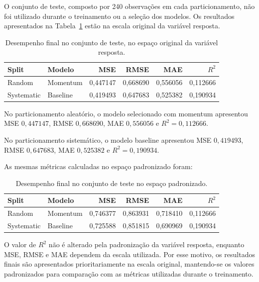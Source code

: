\documentclass[11pt,a4paper]{article}
\begin{document}
O conjunto de teste, composto por 240 observações em cada
particionamento, não foi utilizado durante o treinamento ou a seleção
dos modelos. Os resultados apresentados na
Tabela~\ref{tab:final_test} estão na escala original da variável
resposta.

\begin{table}[H]
\centering
\small
\caption{Desempenho final no conjunto de teste, no espaço original da
variável resposta.}
\label{tab:final_test}
\begin{tabular}{llrrrr}
\toprule
\textbf{Split} &
\textbf{Modelo} &
\textbf{MSE} &
\textbf{RMSE} &
\textbf{MAE} &
\textbf{$R^2$} \\
\midrule
Random &
Momentum &
0,447147 &
0,668690 &
0,556056 &
0,112666 \\

Systematic &
Baseline &
0,419493 &
0,647683 &
0,525382 &
0,190934 \\
\bottomrule
\end{tabular}
\end{table}

No particionamento aleatório, o modelo selecionado com momentum
apresentou MSE $0,447147$, RMSE $0,668690$, MAE $0,556056$ e
$R^2=0,112666$.

No particionamento sistemático, o modelo baseline apresentou MSE
$0,419493$, RMSE $0,647683$, MAE $0,525382$ e
$R^2=0,190934$.

As mesmas métricas calculadas no espaço padronizado foram:

\begin{table}[H]
\centering
\small
\caption{Desempenho final no conjunto de teste no espaço padronizado.}
\label{tab:final_test_scaled}
\begin{tabular}{llrrrr}
\toprule
\textbf{Split} &
\textbf{Modelo} &
\textbf{MSE} &
\textbf{RMSE} &
\textbf{MAE} &
\textbf{$R^2$} \\
\midrule
Random &
Momentum &
0,746377 &
0,863931 &
0,718410 &
0,112666 \\

Systematic &
Baseline &
0,725588 &
0,851815 &
0,690969 &
0,190934 \\
\bottomrule
\end{tabular}
\end{table}

O valor de $R^2$ não é alterado pela padronização da variável resposta,
enquanto MSE, RMSE e MAE dependem da escala utilizada. Por esse motivo,
os resultados finais são apresentados prioritariamente na escala
original, mantendo-se os valores padronizados para comparação com as
métricas utilizadas durante o treinamento.
\end{document}
